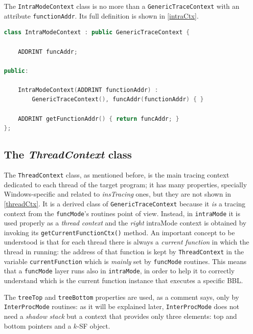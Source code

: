 \documentclass[a4paper,10pt]{report}
\begin{document}
The \verb|IntraModeContext| class is no more than a 
\verb|GenericTraceContext| with an attribute \verb|functionAddr|.
Its full definition is shown in \cref{intraCtx}.

\begin{lstlisting}[language=C++, 
	caption={definition of \texttt{IntraModeContext}}, 
	label=intraCtx, frame=leftline]
class IntraModeContext : public GenericTraceContext {

	ADDRINT funcAddr;

public:

	IntraModeContext(ADDRINT functionAddr) : 
		GenericTraceContext(), funcAddr(functionAddr) { }

	ADDRINT getFunctionAddr() { return funcAddr; }
};


\end{lstlisting}

\subsection{The \emph{ThreadContext} class}

The \verb|ThreadContext| class, as mentioned before, is the main 
tracing context dedicated to each thread of the target program; it has
many properties, specially Windows-specific and related to \emph{insTracing} ones,
but they are not shown in \cref{threadCtx}. 
It is a derived class of \verb|GenericTraceContext| because it \emph{is} 
a tracing context from the \verb|funcMode|'s routines point of view.
Instead, in \verb|intraMode| it is used properly as a \emph{thread context} 
and the \emph{right} intraMode context is obtained by invoking its 
\verb|getCurrentFunctionCtx()| method.
An important concept to be understood is that for each thread there is
always a \emph{current function} in which the thread in running: 
the address of that function is kept by \verb|ThreadContext| in the
variable \verb|currentFunction| which is \emph{mainly} set by \verb|funcMode|
routines. This means that a \verb|funcMode| layer runs also in \verb|intraMode|,
in order to help it to correctly understand which is 
the current function instance that executes a specific BBL.

The \verb|treeTop| and \verb|treeBottom| properties are used, as a comment says,
only by \verb|InterProcMode| routines: as it will be explained later, 
\verb|InterProcMode| does not need a \emph{shadow stack} 
but a context that provides only three elements: 
top and bottom pointers and a $k$-SF object.
\end{document}
